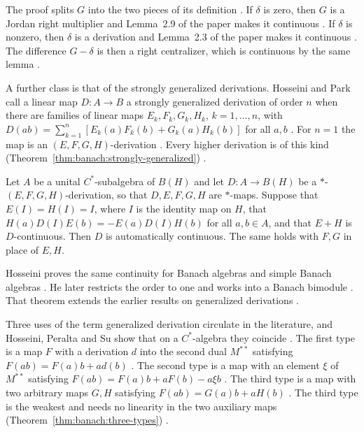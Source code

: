 The proof splits $G$ into the two pieces of its definition
\cite[p.~223]{Ali2011GeneralizedLeft}. If $\delta$ is zero, then $G$ is a
Jordan right multiplier and Lemma~2.9 of the paper makes it continuous
\cite[p.~223]{Ali2011GeneralizedLeft}. If $\delta$ is nonzero, then $\delta$
is a derivation and Lemma~2.3 of the paper makes it continuous
\cite[p.~223]{Ali2011GeneralizedLeft}. The difference $G-\delta$ is then a right centralizer,
which is continuous by the same lemma \cite[p.~223]{Ali2011GeneralizedLeft}.

A further class is that of the strongly generalized derivations.
Hosseini and Park call a linear map $D\colon A\to B$ a strongly generalized
derivation of order $n$ when there are families of linear maps
$E_{k},F_{k},G_{k},H_{k}$, $k=1,\dots,n$, with
$D(ab)=\sum_{k=1}^{n}[E_{k}(a)F_{k}(b)+G_{k}(a)H_{k}(b)]$ for all $a,b$
\cite[Definition~2.1, p.~3]{HosseiniPark2023}. For $n=1$ the map is an
$(E,F,G,H)$-derivation \cite[p.~3]{HosseiniPark2023}. Every higher derivation
is of this kind (Theorem~\ref{thm:banach:strongly-generalized}) \cite[Example~2.3, p.~4]{HosseiniPark2023}.

\begin{theorem}\label{thm:banach:strongly-generalized}
Let $A$ be a unital $C^*$-subalgebra of $B(H)$ and let $D\colon A\to B(H)$ be
a $*$-$(E,F,G,H)$-derivation, so that $D,E,F,G,H$ are $*$-maps. Suppose that
$E(I)=H(I)=I$, where $I$ is the identity map on $H$, that
$H(a)D(I)E(b)=-E(a)D(I)H(b)$ for all $a,b\in A$, and that $E+H$ is
$D$-continuous. Then $D$ is automatically continuous. The same holds with
$F,G$ in place of $E,H$.
\end{theorem}

Hosseini proves the same continuity for Banach algebras and simple Banach
algebras \cite[Theorems~2.11--2.12, p.~7]{HosseiniPark2023}. He later
restricts the order to one and works into a Banach bimodule
\cite[Theorem~2.1, p.~5]{Hosseini2025Strongly}. That theorem extends the
earlier results on generalized derivations
\cite[p.~1]{Hosseini2025Strongly}.

Three uses of the term generalized derivation circulate in the literature, and
Hosseini, Peralta and Su show that on a $C^*$-algebra they coincide
\cite[p.~1]{HosseiniPeraltaSu2025}. The first type is a map $F$ with a
derivation $d$ into the second dual $M^{**}$ satisfying $F(ab)=F(a)b+ad(b)$
\cite[p.~1]{HosseiniPeraltaSu2025}. The second type is a map with an element
$\xi$ of $M^{**}$ satisfying $F(ab)=F(a)b+aF(b)-a\xi b$
\cite[p.~1]{HosseiniPeraltaSu2025}. The third type is a map with two arbitrary
maps $G,H$ satisfying $F(ab)=G(a)b+aH(b)$
\cite[p.~1]{HosseiniPeraltaSu2025}. The third type is the weakest and needs no
linearity in the two auxiliary maps (Theorem~\ref{thm:banach:three-types}) \cite[p.~2]{HosseiniPeraltaSu2025}.

